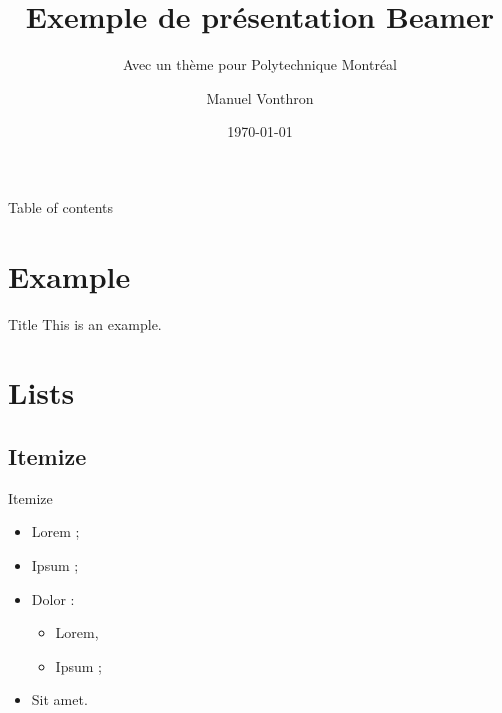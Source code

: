 \documentclass{beamer}
\begin{document}
\title[Th\`eme Beamer Polymtl]{Exemple de pr\'esentation Beamer} 
\subtitle{Avec un th\`eme pour Polytechnique Montr\'eal}
\author{Manuel Vonthron} 
\date{\today} 

\begin{frame}[plain]
  \titlepage
\end{frame}


\begin{frame}{Table of contents}
  \tableofcontents
\end{frame}


\section{Example} 
\begin{frame}{Title} 
  This is an example.
\end{frame}


\section{Lists} 
\subsection{Itemize}

\begin{frame}{Itemize}
  \begin{itemize}
    \item Lorem ; \pause
    \item Ipsum ;
    \item Dolor : \pause
      \begin{itemize}
        \item Lorem,
        \item Ipsum ;
      \end{itemize}
    \item Sit amet.
  \end{itemize} 
\end{frame}
\end{document}
